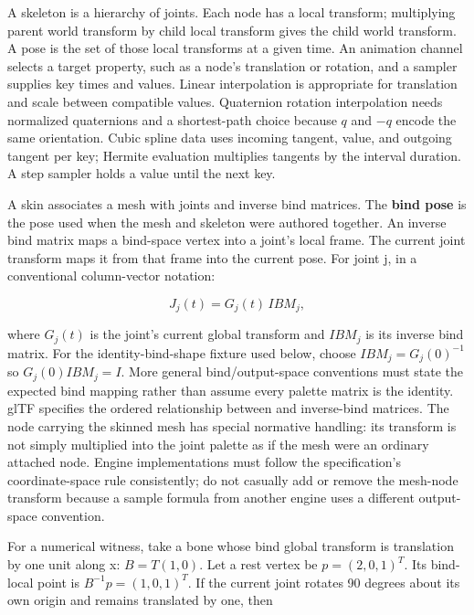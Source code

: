 \hypertarget{04-visual-computing-ii-ch037-build-a-pose-first-then-deform-the-surface}{}

A skeleton is a hierarchy of joints. Each node has a local transform; multiplying parent world transform by child local transform gives the child world transform. A pose is the set of those local transforms at a given time. An animation channel selects a target property, such as a node's translation or rotation, and a sampler supplies key times and values. Linear interpolation is appropriate for translation and scale between compatible values. Quaternion rotation interpolation needs normalized quaternions and a shortest-path choice because \(q\) and \(-q\) encode the same orientation. Cubic spline data uses incoming tangent, value, and outgoing tangent per key; Hermite evaluation multiplies tangents by the interval duration. A step sampler holds a value until the next key.

A skin associates a mesh with joints and inverse bind matrices. The \textbf{bind pose} is the pose used when the mesh and skeleton were authored together. An inverse bind matrix maps a bind-space vertex into a joint's local frame. The current joint transform maps it from that frame into the current pose. For joint j, in a conventional column-vector notation:

\[
J_j(t)=G_j(t)\,IBM_j,
\]

where \(G_j(t)\) is the joint's current global transform and \(IBM_j\) is its inverse bind matrix. For the identity-bind-shape fixture used below, choose \(IBM_j=G_j(0)^{-1}\) so \(G_j(0)IBM_j=I\). More general bind/output-space conventions must state the expected bind mapping rather than assume every palette matrix is the identity. glTF specifies the ordered relationship between  and inverse-bind matrices. The node carrying the skinned mesh has special normative handling: its transform is not simply multiplied into the joint palette as if the mesh were an ordinary attached node. Engine implementations must follow the specification's coordinate-space rule consistently; do not casually add or remove the mesh-node transform because a sample formula from another engine uses a different output-space convention.

For a numerical witness, take a bone whose bind global transform is translation by one unit along x: \(B=T(1,0)\). Let a rest vertex be \(p=(2,0,1)^T\). Its bind-local point is \(B^{-1}p=(1,0,1)^T\). If the current joint rotates 90 degrees about its own origin and remains translated by one, then

